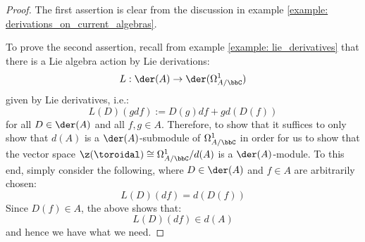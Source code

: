             \begin{proof}
                The first assertion is clear from the discussion in example \ref{example: derivations_on_current_algebras}.
            
                To prove the second assertion, recall from example \ref{example: lie_derivatives} that there is a Lie algebra action by Lie derivations:
                    $$L: \der(A) \to \der(\Omega^1_{A/\bbC})$$
                given by Lie derivatives, i.e.:
                    $$L(D)( g df ) := D(g) df + g d(D(f))$$
                for all $D \in \der(A)$ and all $f, g \in A$. Therefore, to show that it suffices to only show that $d(A)$ is a $\der(A)$-submodule of $\Omega^1_{A/\bbC}$ in order for us to show that the vector space $\z(\toroidal) \cong \Omega^1_{A/\bbC}/d(A)$ is a $\der(A)$-module. To this end, simply consider the following, where $D \in \der(A)$ and $f \in A$ are arbitrarily chosen:
                    $$L(D)( df ) = d( D(f) )$$
                Since $D(f) \in A$, the above shows that:
                    $$L(D)( df ) \in d(A)$$
                and hence we have what we need.


\end{proof}
